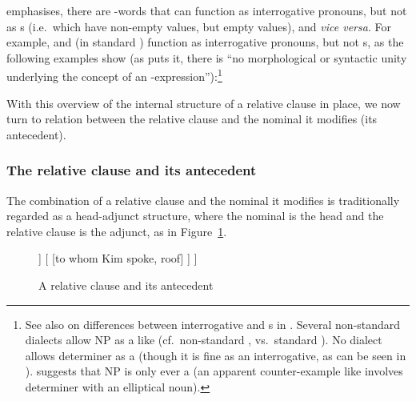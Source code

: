 \documentclass[output=paper
                ,modfonts
                ,nonflat
	        ,collection
	        ,collectionchapter
	        ,collectiontoclongg
 	        ,biblatex
                ,babelshorthands
                ,newtxmath
                ,draftmode
                ,colorlinks, citecolor=brown
]{./langsci/langscibook}
\begin{document}
\cite[490--493]{Sag:10b} emphasises, there are -words that can function as
interrogative pronouns, but not as s (i.e.\ which have non-empty
 values, but empty  values), and \emph{vice versa}. For example,
 and (in standard )  function as interrogative pronouns,
but not s, as the following examples show (as \citealt[493]{Sag:10b} puts it, there
is ``no morphological or syntactic unity underlying the concept of an 
-expression''):\footnote{See also \cite[81--85]{Mueller99b} on differences
  between interrogative and s in . Several non-standard 
  dialects allow NP  as a  like  (cf.\ non-standard
  , vs.\ standard ). No
  dialect allows determiner  as a  (though it is fine as an
  interrogative, as can be seen in ). \cite[491, note 10]{Sag:10b} suggests
  that NP  is only ever a  (an apparent counter-example like
    involves determiner  with an elliptical noun).}
\begin{exe}\ex\begin{xlist}
\end{xlist}\end{exe}
\begin{exe}\ex\begin{xlist}
\end{xlist}\end{exe}

With this overview of the internal structure of a relative clause in place, we now turn to
relation between the relative clause and the nominal it modifies (its antecedent).

\subsubsection{The relative clause and its antecedent}
\label{sec:rc-relative-clause-ante}

The combination of a relative clause and the nominal it modifies is traditionally
regarded as a head-adjunct structure, where the nominal is the head and the
relative clause is the adjunct, as in Figure~\ref{fig:rc-2}.
\begin{figure}
  \begin{forest}  %
   [{\ibar{N}\subtag{1}} ,baseline
      [{\idx{2} \ibar{N}\subtag{1}}  [ {person} ] ]
      [{}
         [{to whom Kim spoke}, roof]
      ]
   ]
   \end{forest}
   \caption{A relative clause and its antecedent}
   \label{fig:rc-2}
 \end{figure}
 
\end{document}

